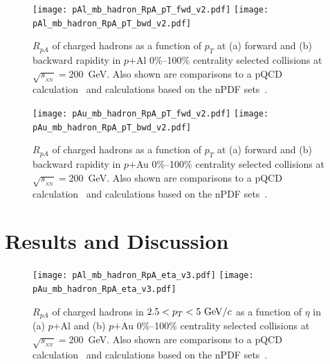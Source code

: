 \documentclass[twocolumn,letterpaper,aps,prc,longbibliography,superscriptaddress,nofootinbib,floatfix]{revtex4-2}
\newcommand{\pt}{\mbox{$p_T$}\xspace}
\newcommand{\rpa}{\mbox{$R_{pA}$}\xspace}
\newcommand{\sqsntwo}{\mbox{$\sqrt{s_{_{NN}}}=200$~GeV}\xspace}
\newcommand{\pau}{\mbox{$p$$+$Au}\xspace}
\newcommand{\pal}{\mbox{$p$$+$Al}\xspace}
\begin{document}
\begin{figure}[htb]
\texttt{[image: pAl\_mb\_hadron\_RpA\_pT\_fwd\_v2.pdf]}
\texttt{[image: pAl\_mb\_hadron\_RpA\_pT\_bwd\_v2.pdf]}
\caption{\label{fig:rpa_pT_pal_mb} 
\rpa of charged hadrons as a function of \pt at (a) forward and 
(b) backward rapidity in \pal 0\%--100\% centrality selected 
collisions at \sqsntwo.  Also shown are comparisons to a pQCD 
calculation~\cite{Kang:2014hha} and calculations based on the nPDF 
sets~\cite{Kovarik:2015cma,Eskola:2016oht}.}
\end{figure}

\begin{figure}[htb]
\texttt{[image: pAu\_mb\_hadron\_RpA\_pT\_fwd\_v2.pdf]}
\texttt{[image: pAu\_mb\_hadron\_RpA\_pT\_bwd\_v2.pdf]}
\caption{\label{fig:rpa_pT_pau_mb} 
\rpa of charged hadrons as a function of \pt at (a) forward and 
(b) backward rapidity in \pau 0\%--100\% centrality selected 
collisions at \sqsntwo.  Also shown are comparisons to a pQCD 
calculation~\cite{Kang:2014hha} and calculations based on the nPDF 
sets~\cite{Kovarik:2015cma,Eskola:2016oht}.}
\end{figure}

\section{Results and Discussion}
\label{sec:results}

\begin{figure}[tbh]
\texttt{[image: pAl\_mb\_hadron\_RpA\_eta\_v3.pdf]}
\texttt{[image: pAu\_mb\_hadron\_RpA\_eta\_v3.pdf]}
\caption{\label{fig:rpa_eta_mb}
\rpa of charged hadrons in $2.5<p_T<5~{\rm GeV}/c$ as a function of 
$\eta$ in (a) \pal and (b) \pau 0\%--100\% centrality 
selected collisions at \sqsntwo.  Also shown are comparisons to a pQCD 
calculation~\cite{Kang:2014hha} and calculations based on the nPDF 
sets~\cite{Kovarik:2015cma,Eskola:2016oht}.}
\end{figure}
\end{document}
